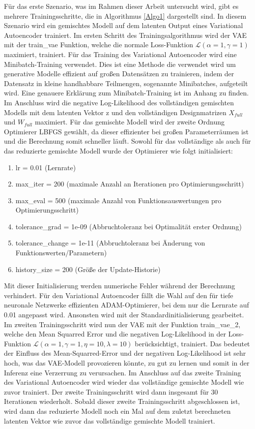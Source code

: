 \documentclass[%
thesis=student,%
coverpage=false,%
titlepage=false,%
headmarks=true, %
german,%
font=libertine, %
math=newpxtx, %
BCOR=5mm,%
coverBCOR=11mm%
]{tumbook}
\theoremstyle{break}
\begin{document}
Für das erste Szenario, was im Rahmen dieser Arbeit untersucht wird, gibt es mehrere Trainingsschritte, die in Algorithmus \ref{Algo1} dargestellt sind. In diesem Szenario wird ein gemischtes Modell auf dem latenten Output eines Variational Autoencoder trainiert. Im ersten Schritt des Trainingsalgorithmus wird der VAE mit der train\_vae Funktion, welche die normale Loss-Funktion $\mathcal{L}(\alpha=1,\gamma=1) $ maximiert, trainiert. Für das Training des Variational Autoencoder wird eine Minibatch-Training verwendet. Dies ist eine Methode die verwendet wird um generative Modelle effizient auf großen Datensätzen zu trainieren, indem der Datensatz in kleine handhabbare Teilmengen, sogenannte Minibatches, aufgeteilt wird. Eine genauere Erklärung zum Minibatch-Training ist im Anhang zu finden. Im Anschluss wird die negative Log-Likelihood des vollständigen gemischten Modells mit dem latenten Vektor z und den vollständigen Designmatrizen $X_{full}$ und $W_{full}$ maximiert. Für das gemischte Modell wird der zweite Ordnung Optimierer LBFGS gewählt, da dieser effizienter bei großen Parameterräumen ist und die Berechnung somit schneller läuft. Sowohl für das vollständige als auch für das reduzierte gemischte Modell wurde der Optimierer wie folgt initialisiert:
\begin{enumerate}
	\item lr = 0.01 (Lernrate)
	\item max\_iter = 200 (maximale Anzahl an Iterationen pro Optimierungsschritt)
	\item max\_eval = 500 (maximale Anzahl von Funktionsauswertungen pro Optimierungsschritt)
	\item tolerance\_grad = 1e-09 (Abbruchtoleranz bei Optimalität erster Ordnung)
	\item tolerance\_change = 1e-11 (Abbruchtoleranz bei Änderung von Funktionswerten/Parametern)
	\item history\_size = 200 (Größe der Update-Historie)
\end{enumerate}
Mit dieser Initialisierung werden numerische Fehler während der Berechnung verhindert.
Für den Variational Autoencoder fällt die Wahl auf den für tiefe neuronale Netzwerke effizienten ADAM-Optimierer, bei dem nur die Lernrate auf 0.01 angepasst wird. Ansonsten wird mit der Standardinitialisierung gearbeitet.\\
Im zweiten Trainingsschritt wird nun der VAE mit der Funktion train\_vae\_2, welche den Mean Squarred Error und die negativen Log-Likelihood in der Loss-Funktion $\mathcal{L}(\alpha=1,\gamma=1,\eta=10,\lambda=10)$ berücksichtigt, trainiert. Das bedeutet der Einfluss des Mean-Squarred-Error und der negativen Log-Likelihood ist sehr hoch, was das VAE-Modell provozieren könnte, zu gut zu lernen und somit in der Inferenz eine Verzerrung zu verursachen. Im Anschluss auf das zweite Training des Variational Autoencoder wird wieder das vollständige gemischte Modell wie zuvor trainiert. Der zweite Trainingsschritt wird dann insgesamt für 30 Iterationen wiederholt. Sobald dieser zweite Trainingsschritt abgeschlossen ist, wird dann das reduzierte Modell noch ein Mal auf dem zuletzt berechneten latenten Vektor wie zuvor das vollständige gemischte Modell trainiert.\\
\end{document}
